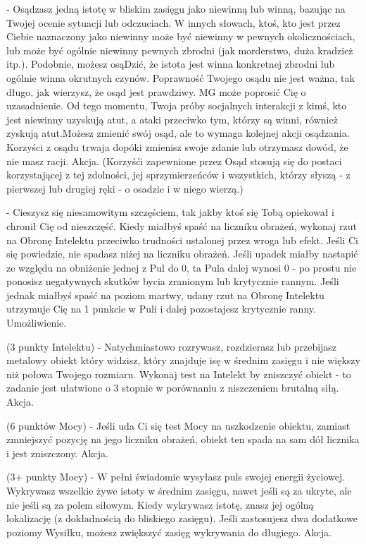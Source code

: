 { - Osądzasz jedną istotę w bliskim zasięgu jako niewinną lub winną, bazując na Twojej ocenie sytuacji lub odczuciach. W innych słowach, ktoś, kto jest przez Ciebie naznaczony jako niewinny może być niewinny w pewnych okolicznościach, lub może być ogólnie niewinny pewnych zbrodni (jak morderstwo, duża kradzież itp.). Podobnie, możesz osąDzić, że istota jest winna konkretnej zbrodni lub ogólnie winna okrutnych czynów. Poprawność Twojego osądu nie jest ważna, tak długo, jak wierzysz, że osąd jest prawdziwy. MG może poprosić Cię o uzasadnienie. Od tego momentu, Twoja próby socjalnych interakcji z kimś, kto jest niewinny uzyskują atut, a ataki przeciwko tym, którzy są winni, również zyskują atut.Możesz zmienić swój osąd, ale to wymaga kolejnej akcji osądzania. Korzyści z osądu trwaja dopóki zmienisz swoje zdanie lub otrzymasz dowód, że nie masz racji. Akcja. (Korzyśći zapewnione przez Osąd stosują się do postaci korzystającej z tej zdolności, jej sprzymierzeńców i wszystkich, którzy słyszą - z pierwszej lub drugiej ręki - o osadzie i w niego wierzą.)

 - Cieszysz się niesamowitym szczęściem, tak jakby ktoś  się Tobą opiekował i chronił Cię od nieszczęść. Kiedy miałbyś spaść na liczniku obrażeń, wykonaj rzut na Obronę Intelektu przeciwko trudności ustalonej przez wroga lub efekt. Jeśli Ci się powiedzie, nie spadasz niżej na liczniku obrażeń. Jeśli upadek miałby nastapić ze względu na obniżenie jednej z Pul do 0, ta Pula dalej wynosi 0 - po prostu nie ponosisz negatywnych skutków bycia zranionym lub krytycznie rannym. Jeśli jednak miałbyś spaść na poziom martwy, udany rzut na Obronę Intelektu utrzymuje Cię na 1 punkcie w Puli i dalej pozostajesz krytycznie ranny. Umożliwienie.

 (3 punkty Intelektu) - Natychmiastowo rozrywasz, rozdzierasz lub przebijasz metalowy obiekt który widzisz, który znajduje isę w średnim zasięgu i nie większy niż połowa Twojego rozmiaru. Wykonaj test na Intelekt by zniszczyć obiekt - to zadanie jest ułatwione o 3 stopnie w porównaniu z niszczeniem brutalną siłą. Akcja. 

 (6 punktów Mocy) - Jeśli uda Ci się test Mocy na uszkodzenie obiektu, zamiast zmniejszyć pozycję na jego liczniku obrażeń, obiekt ten spada na sam dół licznika i jest zniszczony. Akcja.

 (3+ punkty Mocy) - W pełni świadomie wysyłasz puls swojej energii życiowej. Wykrywasz wszelkie żywe istoty w średnim zasięgu, nawet jeśli są za ukryte, ale nie jeśli są za polem siłowym. Kiedy wykrywasz istotę, znasz jej ogólną lokalizację (z dokładnością do bliskiego zasięgu). Jeśli zastosujesz dwa dodatkowe poziomy Wysiłku, możesz zwiększyć zasięg wykrywania do długiego. Akcja.

}
